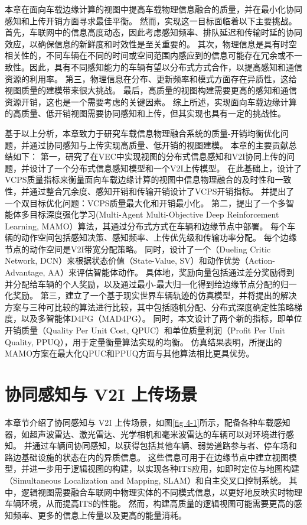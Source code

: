 本章在面向车载边缘计算的视图中提高车载物理信息融合的质量，并在最小化协同感知和上传开销方面寻求最佳平衡。
然而，实现这一目标面临着以下主要挑战。
首先，车联网中的信息高度动态，因此考虑感知频率、排队延迟和传输时延的协同效应，以确保信息的新鲜度和时效性是至关重要的。
其次，物理信息是具有时空相关性的，不同车辆在不同的时间或空间范围内感应到的信息可能存在冗余或不一致性。因此，具有不同感知能力的车辆有望以分布式方式合作，以提高感知和通信资源的利用率。
第三，物理信息在分布、更新频率和模式方面存在异质性，这给视图质量的建模带来很大挑战。
最后，高质量的视图构建需要更高的感知和通信资源开销，这也是一个需要考虑的关键因素。
综上所述，实现面向车载边缘计算的高质量、低开销视图需要协同感知和上传，但其实现也具有一定的挑战性。

基于以上分析，本章致力于研究车载信息物理融合系统的质量-开销均衡优化问题，并通过协同感知与上传实现高质量、低开销的视图建模。
本章的主要贡献总结如下：
第一，研究了在VEC中实现视图的分布式信息感知和V2I协同上传的问题，并设计了一个分布式信息感知模型和一个V2I上传模型。
在此基础上，设计了VCPS质量指标来衡量面向车载边缘计算的视图中信息物理融合的及时性和一致性，并通过整合冗余度、感知开销和传输开销设计了VCPS开销指标。
并提出了一个双目标优化问题：VCPS质量最大化和开销最小化。
第二，提出了一个多智能体多目标深度强化学习(Multi-Agent Multi-Objective Deep Reinforcement Learning, MAMO）算法，其通过分布式方式在车辆和边缘节点中部署。
每个车辆的动作空间包括感知决策、感知频率、上传优先级和传输功率分配。
每个边缘节点的动作空间是V2I带宽分配策略。
同时，设计了一个（Dueling Critic Network, DCN）来根据状态价值（State-Value, SV）和动作优势（Action-Advantage, AA）来评估智能体动作。
具体地，奖励向量包括通过差分奖励得到并分配给车辆的个人奖励，以及通过最小-最大归一化得到给边缘节点分配的归一化奖励。
第三，建立了一个基于现实世界车辆轨迹的仿真模型，并将提出的解决方案与三种可比较的算法进行比较，其中包括随机分配、分布式深度确定性策略梯度\cite{barth2018distributed}，以及多智能体D4PG（MAD4PG）。
同时，本文设计了两个新的指标，即单位开销质量（Quality Per Unit Cost, QPUC）和单位质量利润（Proﬁt Per Unit Quality, PPUQ），用于定量衡量算法实现的均衡。
仿真结果表明，所提出的MAMO方案在最大化QPUC和PPUQ方面与其他算法相比更具优势。

\section{协同感知与 V2I 上传场景}\label{section 4-2}

本章节介绍了协同感知与 V2I 上传场景，如图\ref{fig 4-1}所示，配备各种车载感知器，如超声波雷达、激光雷达、光学相机和毫米波雷达的车辆可以对环境进行感知。
并通过车辆间协同感知，以获得包括其他车辆、弱势道路参与者、停车场和路边基础设施的状态在内的异质信息。
这些信息可用于在边缘节点中建立视图模型，并进一步用于逻辑视图的构建，以实现各种ITS应用，如即时定位与地图构建（Simultaneous Localization and Mapping, SLAM）和自主交叉口控制系统。
其中，逻辑视图需要融合车联网中物理实体的不同模式信息，以更好地反映实时物理车辆环境，从而提高ITS的性能。
然而，构建高质量的逻辑视图可能需要更高的感知频率、更多的信息上传量以及更高的能量消耗。

